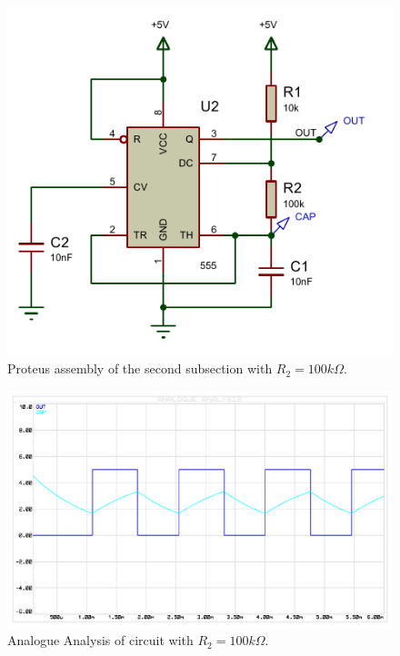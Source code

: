 \documentclass[a4paper, 11pt, oneside]{article}
\begin{document}
\begin{figure}[H]
    \centering
    \includegraphics[scale = 1.1]{Graphics/Practice 2/GRAPHICS/555/GRAPHS/PROTEUS/ASSEMBLY/555_ASTABLE_100K_ASSEMBLY.PDF}
    \caption{Proteus assembly of the second subsection with $R_2 = 100k \Omega$.}
    \label{fig:555_ASTABLE_100K_ASSEMBLY}
\end{figure}

\begin{figure}[H]
    \centering
    \includegraphics[scale = 0.75]{Graphics/Practice 2/GRAPHICS/555/GRAPHS/PROTEUS/ANALOGUE/555_ASTABLE_ANALOGUE_100K.PDF}
    \caption{Analogue Analysis of circuit with $R_2 = 100k \Omega$.}
    \label{fig:555_ASTABLE_ANALOGUE_100K}
\end{figure}
\end{document}
